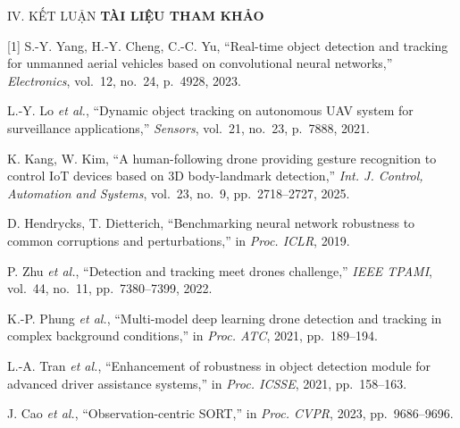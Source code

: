 \documentclass[10pt]{extarticle}
\begin{document}
{{\begin{cotbox}{IV. KẾT LUẬN}
\vspace{2pt}
{\color{dam}\bfseries\large TÀI LIỆU THAM KHẢO}\par\vspace{2pt}
{\scriptsize
[1] S.-Y. Yang, H.-Y. Cheng, C.-C. Yu, ``Real-time object detection and tracking for unmanned aerial vehicles based on convolutional neural networks,'' \textit{Electronics}, vol.~12, no.~24, p.~4928, 2023.\par
[2] L.-Y. Lo \textit{et al.}, ``Dynamic object tracking on autonomous UAV system for surveillance applications,'' \textit{Sensors}, vol.~21, no.~23, p.~7888, 2021.\par
[3] K. Kang, W. Kim, ``A human-following drone providing gesture recognition to control IoT devices based on 3D body-landmark detection,'' \textit{Int. J. Control, Automation and Systems}, vol.~23, no.~9, pp.~2718--2727, 2025.\par
[4] D. Hendrycks, T. Dietterich, ``Benchmarking neural network robustness to common corruptions and perturbations,'' in \textit{Proc. ICLR}, 2019.\par
[5] P. Zhu \textit{et al.}, ``Detection and tracking meet drones challenge,'' \textit{IEEE TPAMI}, vol.~44, no.~11, pp.~7380--7399, 2022.\par
[6] K.-P. Phung \textit{et al.}, ``Multi-model deep learning drone detection and tracking in complex background conditions,'' in \textit{Proc. ATC}, 2021, pp.~189--194.\par
[7] L.-A. Tran \textit{et al.}, ``Enhancement of robustness in object detection module for advanced driver assistance systems,'' in \textit{Proc. ICSSE}, 2021, pp.~158--163.\par
[8] J. Cao \textit{et al.}, ``Observation-centric SORT,'' in \textit{Proc. CVPR}, 2023, pp.~9686--9696.\par}
\end{cotbox}}%
  \vfill}
\end{document}
